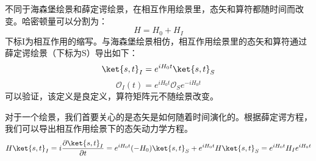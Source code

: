 \begin{definition}{}

不同于海森堡绘景和薛定谔绘景，在相互作用绘景里，态矢和算符都随时间而改变。哈密顿量可以分割为：
\begin{equation}
H=H_0+H_I
\end{equation}
下标I为相互作用的缩写。与海森堡绘景相仿，相互作用绘景里的态矢和算符通过薛定谔绘景（下标为S）导出如下：
\begin{equation}
\ket{s,t}_I=e^{iH_0 t}\ket{s,t}_S
\end{equation}
\begin{equation}
\mathcal O_I(t)=e^{iH_0 t}\mathcal O_Se^{-iH_0 t}
\end{equation}
可以验证，该定义是良定义，算符矩阵元不随绘景改变。
\end{definition}
对于一个绘景，我们首要关心的是态矢是如何随着时间演化的。根据薛定谔方程，我们可以导出相互作用绘景下的态矢动力学方程。
\begin{equation}
H\ket{s,t}_I=i\frac{\partial\ket{s,t}_I}{\partial t}= e^{iH_0 t}(-H_0)\ket{s,t}_S+e^{iH_0 t}H\ket{s,t}_S=e^{iH_0 t}H_Ie^{iH_0 t}
\end{equation}


